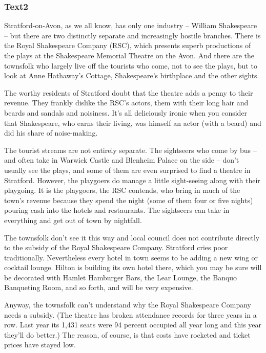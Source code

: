 \documentclass[a4paper]{article}
\begin{document}
\subsubsection{Text2}

\par
Stratford-on-Avon, as we all know, has only one industry -- William Shakespeare -- but there are two distinctly separate and increasingly hostile branches. There is the Royal Shakespeare Company (RSC), which presents superb productions of the plays at the Shakespeare Memorial Theatre on the Avon. And there are the townsfolk who largely live off the tourists who come, not to see the plays, but to look at Anne Hathaway’s Cottage, Shakespeare’s birthplace and the other sights.

\par
The worthy residents of Stratford doubt that the theatre adds a penny to their revenue. They frankly dislike the RSC’s actors, them with their long hair and beards and sandals and noisiness. It’s all deliciously ironic when you consider that Shakespeare, who earns their living, was himself an actor (with a beard) and did his share of noise-making.

\par
The tourist streams are not entirely separate. The sightseers who come by bus -- and often take in Warwick Castle and Blenheim Palace on the side -- don’t usually see the plays, and some of them are even surprised to find a theatre in Stratford. However, the playgoers do manage a little sight-seeing along with their playgoing. It is the playgoers, the RSC contends, who bring in much of the town’s revenue because they spend the night (some of them four or five nights) pouring cash into the hotels and restaurants. The sightseers can take in everything and get out of town by nightfall.

\par
The townsfolk don’t see it this way and local council does not contribute directly to the subsidy of the Royal Shakespeare Company. Stratford cries poor traditionally. Nevertheless every hotel in town seems to be adding a new wing or cocktail lounge. Hilton is building its own hotel there, which you may be sure will be decorated with Hamlet Hamburger Bars, the Lear Lounge, the Banquo Banqueting Room, and so forth, and will be very expensive.

\par
Anyway, the townsfolk can’t understand why the Royal Shakespeare Company needs a subsidy. (The theatre has broken attendance records for three years in a row. Last year its 1,431 seats were 94 percent occupied all year long and this year they’ll do better.) The reason, of course, is that costs have rocketed and ticket prices have stayed low.
\end{document}
